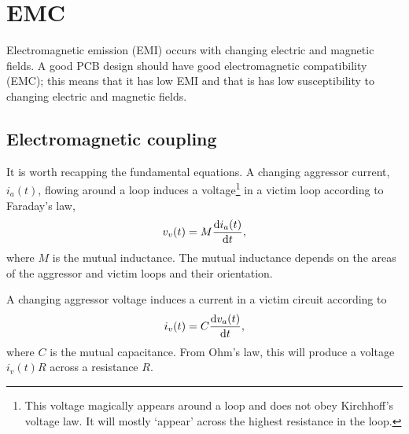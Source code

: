 \chapter{EMC}


Electromagnetic emission (EMI) occurs with changing electric and
magnetic fields.  A good PCB design should have good electromagnetic
compatibility (EMC); this means that it has low EMI and that is has
low susceptibility to changing electric and magnetic fields.


\section{Electromagnetic coupling}

It is worth recapping the fundamental equations.  A changing aggressor
current, $i_a(t)$, flowing around a loop induces a
voltage\footnote{This voltage magically appears around a loop and does
  not obey Kirchhoff's voltage law.  It will mostly `appear' across
  the highest resistance in the loop.} in a victim loop according to
Faraday's law,
%
\begin{equation}
  v_v(t) = M \frac{\mathrm{d} i_a(t)}{\mathrm{d} t},
\end{equation}
%
where $M$ is the mutual inductance.  The mutual inductance depends on
the areas of the aggressor and victim loops and their orientation.

A changing aggressor voltage induces a current in a victim circuit
according to
%
\begin{equation}
  i_v(t) = C \frac{\mathrm{d} v_a(t)}{\mathrm{d} t},
\end{equation}
%
where $C$ is the mutual capacitance.  From Ohm's law, this will
produce a voltage $i_v(t) R$ across a resistance $R$.
